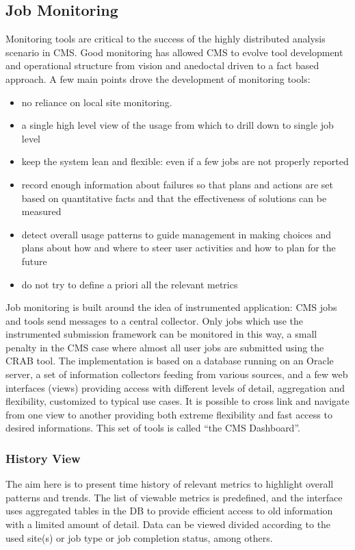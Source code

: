 \subsection{Job Monitoring}
\label{sec:3_3}
Monitoring tools are critical to the success of the
highly distributed analysis scenario in CMS.
Good monitoring has allowed CMS to evolve tool development
and operational structure from vision and anedoctal driven
to a fact based approach.
A few main points drove the development of monitoring tools:
\begin{itemize}
\item no reliance on local site monitoring.
\item a single  high level view of the usage from which
  to drill down to single job level
\item   keep the system lean and flexible: even if a few
  jobs are not properly reported
\item record
  enough information about failures so that plans and actions are set
  based on quantitative facts and that  the effectiveness of solutions can be measured 
\item detect overall usage patterns to guide management in making
 choices and plans about how and where to steer user activities and
 how to plan for the future
\item do not try to define a priori all the relevant metrics
\end{itemize}

Job monitoring is built around the idea of instrumented
application: CMS jobs and tools send messages
to a central collector. Only jobs which use the
instrumented submission framework can be monitored in this way,
a small penalty in the CMS case where almost
all user jobs are submitted using the CRAB tool.
The implementation is based on a
database running on an Oracle server, a set of information collectors
feeding from various sources, 
and a few web interfaces (views) providing access with different levels
of detail, aggregation and flexibility, customized to
typical use cases. It is possible to cross link and navigate
from one view to another providing both extreme flexibility
and fast access to desired informations.
This set of tools is called ``the CMS Dashboard''.

\subsubsection{History View}
The aim here is to present time history of relevant
metrics to highlight overall patterns and trends.
The list of viewable metrics is predefined, and
the interface uses aggregated tables in the DB to provide
efficient access to old information with a limited
amount of detail. Data can be viewed divided
according to the used site(s) or job type or job completion status, among others.


